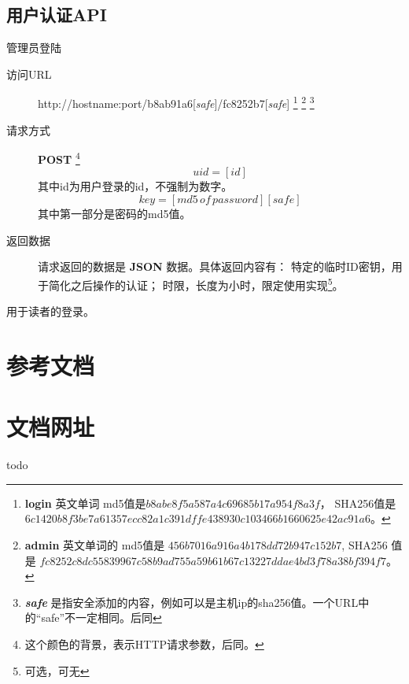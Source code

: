 \documentclass[UTF8]{ctexart}
\begin{document}
    \subsection{用户认证API}
     管理员登陆
    \begin{description}
        \item[访问URL] http://hostname:port/b8ab91a6[\textit{safe}]/fc8252b7[\textit{safe}]
        \footnote{
            \textbf{login} 英文单词 md5值是$b8abe8f5a587a4c69685b17a954f8a3f$，
            SHA256值是 
            $6c1420b8f3be7a61357ecc82a1c391dffe438930c103466b1660625e42ac91a6$。
            }
        \footnote{
            \textbf{admin} 英文单词的
            md5值是 $456b7016a916a4b178dd72b947c152b7 $,
            SHA256 值是
            $fc8252c8dc55839967c58b9ad755a59b61b67c13227ddae4bd3f78a38bf394f7$。
            }
        \footnote{\textit{\textbf{safe}} 是指安全添加的内容，例如可以是主机ip的sha256值。一个URL中的“safe”不一定相同。后同}
        \item[请求方式] \textbf{POST}
        \footnote{这个颜色的背景，表示HTTP请求参数，后同。}
        $$uid=[id]$$
        其中id为用户登录的id，不强制为数字。
         $$key=[md5\, of\, password][safe]$$
         其中第一部分是密码的md5值。
        \item[返回数据]请求返回的数据是 \textbf{JSON} 数据。具体返回内容有：
        特定的临时ID密钥，用于简化之后操作的认证；
        时限，长度为小时，限定使用实现\footnote{可选，可无}。
    \end{description}
		用于读者的登录。
		\begin{description}
		\item[]
		\end{description}
    \newpage
    \begin{appendices}
    \section{参考文档}
    \section{文档网址}
    todo 
    \end{appendices}
    
\end{document}
